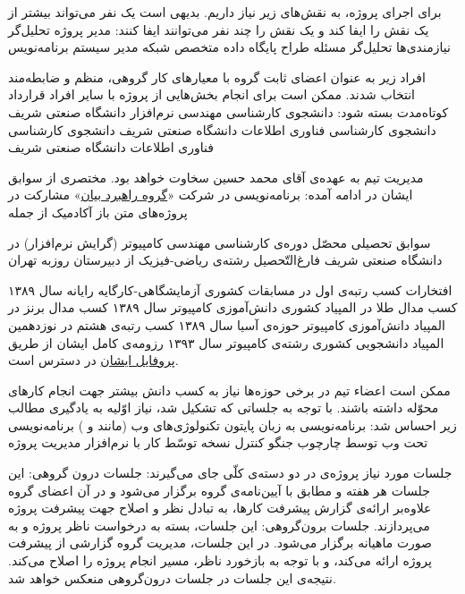 برای اجرای پروژه، به نقش‌های زیر نیاز داریم. بدیهی است یک نفر می‌تواند بیشتر از یک نقش را ایفا کند و یک نقش را چند نفر می‌توانند ایفا کنند:
 مدیر پروژه
 تحلیل‌گر نیازمندی‌ها
 تحلیل‌گر مسئله
 طراح پایگاه داده
 متخصص شبکه
 مدیر سیستم
 برنامه‌نویس

افراد زیر به عنوان اعضای ثابت گروه با معیارهای کار گروهی، منظم و ضابطه‌مند انتخاب شدند. ممکن است برای انجام بخش‌هایی از پروژه با سایر افراد قرارداد کوتاه‌مدت بسته شود:
 دانشجوی کارشناسی مهندسی نرم‌افزار دانشگاه صنعتی شریف
 دانشجوی کارشناسی فناوری اطلاعات دانشگاه صنعتی شریف
 دانشجوی کارشناسی فناوری اطلاعات دانشگاه صنعتی شریف

مدیریت تیم به عهده‌ی آقای محمد حسین سخاوت خواهد بود. مختصری از سوابق ایشان در ادامه آمده:
 برنامه‌نویسی در شرکت «\href{http://bayan.co.ir/}{گروه راهبرد بیان}» 
 مشارکت در پروژه‌های متن باز آکادمیک از جمله 

 سوابق تحصیلی
 محصّل دوره‌ی کارشناسی مهندسی کامپیوتر (گرایش نرم‌افزار) در دانشگاه صنعتی شریف
 فارغ‌التّحصیل رشته‌ی ریاضی-فیزیک از دبیرستان روزبه تهران

 افتخارات
 کسب رتبه‌ی اول در مسابقات کشوری آزمایشگاهی-کارگایه رایانه سال ۱۳۸۹
 کسب مدال طلا در المپیاد کشوری دانش‌آموزی کامپیوتر سال ۱۳۸۹
 کسب مدال برنز در المپیاد دانش‌آموزی کامپیوتر حوزه‌ی آسیا سال ۱۳۸۹
 کسب رتبه‌ی هشتم در نوزدهمین المپیاد دانشجویی کشوری رشته‌ی کامپیوتر سال ۱۳۹۳
رزومه‌ی کامل ایشان از طریق \href{https://www.linkedin.com/profile/view?id=159934426}{پروفایل  ایشان} در دسترس است.


ممکن است اعضاء تیم در برخی حوزه‌ها نیاز به کسب دانش بیشتر جهت انجام کارهای محوّله داشته باشند. با توجه به جلساتی که تشکیل شد، نیاز اوّلیه به یادگیری مطالب زیر احساس شد:
 برنامه‌نویسی به زبان پایتون
 تکنولوژی‌های وب (مانند  و )
 برنامه‌نویسی تحت وب توسط چارچوب جنگو
 کنترل نسخه توسّط 
 کار با نرم‌افزار مدیریت پروژه 

جلسات مورد نیاز پروژه‌ی \PRJN{} در دو دسته‌ی کلّی جای می‌گیرند:
 جلسات درون گروهی: این جلسات هر هفته و مطابق با آیین‌نامه‌ی گروه برگزار می‌شود و در آن اعضای گروه علاوه‌بر ارائه‌ی گزارش پیشرفت کارها، به تبادل نظر و اصلاح جهت پیشرفت پروژه می‌پردازند.
 جلسات برون‌گروهی: این جلسات، بسته به درخواست ناظر پروژه و به صورت ماهیانه برگزار می‌شود. در این جلسات، مدیریت گروه گزارشی از پیشرفت پروژه ارائه می‌کند، و با توجه به بازخورد ناظر، مسیر انجام پروژه را اصلاح می‌کند. نتیجه‌ی این جلسات در جلسات درون‌گروهی منعکس خواهد شد.

